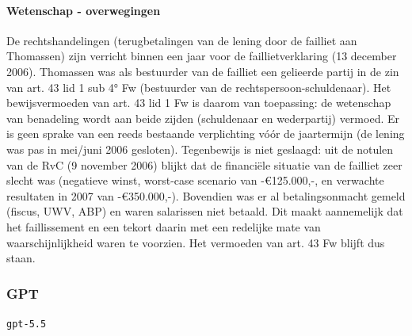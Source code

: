 \documentclass[
  dutch,
  a4paper,
]{article}
\begin{document}
\paragraph{Wetenschap - overwegingen}\label{wetenschap---overwegingen-75}

De rechtshandelingen (terugbetalingen van de lening door de failliet aan Thomassen) zijn verricht binnen een jaar voor de faillietverklaring (13 december 2006). Thomassen was als bestuurder van de failliet een gelieerde partij in de zin van art. 43 lid 1 sub 4° Fw (bestuurder van de rechtspersoon-schuldenaar). Het bewijsvermoeden van art. 43 lid 1 Fw is daarom van toepassing: de wetenschap van benadeling wordt aan beide zijden (schuldenaar en wederpartij) vermoed. Er is geen sprake van een reeds bestaande verplichting vóór de jaartermijn (de lening was pas in mei/juni 2006 gesloten). Tegenbewijs is niet geslaagd: uit de notulen van de RvC (9 november 2006) blijkt dat de financiële situatie van de failliet zeer slecht was (negatieve winst, worst-case scenario van -€125.000,-, en verwachte resultaten in 2007 van -€350.000,-). Bovendien was er al betalingsonmacht gemeld (fiscus, UWV, ABP) en waren salarissen niet betaald. Dit maakt aannemelijk dat het faillissement en een tekort daarin met een redelijke mate van waarschijnlijkheid waren te voorzien. Het vermoeden van art. 43 Fw blijft dus staan.

\newpage


\subsubsection{GPT}\label{gpt-25}

\texttt{gpt-5.5}
\end{document}
